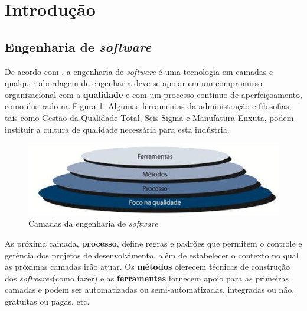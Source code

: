 
\newcommand{\sw}{\textit{software}\xspace}
\newcommand{\sws}{\textit{softwares}\xspace}
\newcommand{\iso}{ISO 29110\xspace}

\section{Introdução}

\subsection{Engenharia de \sw}

De acordo com \cite{pressman}, a engenharia de \sw é uma tecnologia em camadas e qualquer abordagem de engenharia deve se apoiar em um compromisso organizacional com a \textbf{qualidade} e com um processo contínuo de aperfeiçoamento, como ilustrado na Figura \ref{fig:sw.camadas}. Algumas ferramentas da administração e filosofias, tais como Gestão da Qualidade Total\footnotemark {}, Seis Sigma\footnotemark {} e Manufatura Enxuta\footnotemark, podem instituir a cultura de qualidade necessária para esta indústria.


\begin{figure}[!h]
\centering
\includegraphics[scale=1]{figuras/eng_sw_camadas.png}
\caption{Camadas da engenharia de \sw \citep[p.17]{pressman}}
\label{fig:sw.camadas}
\end{figure}

As próxima camada, \textbf{processo}, define regras e padrões que permitem o controle e gerência dos projetos de desenvolvimento, além de estabelecer o contexto no qual as próximas camadas irão atuar. Os \textbf{métodos} oferecem técnicas de construção dos \sws (como fazer) e as \textbf{ferramentas} fornecem apoio para as primeiras camadas e podem ser automatizadas ou semi-automatizadas, integradas ou não, gratuitas ou pagas, etc.

